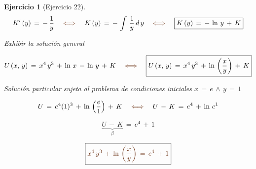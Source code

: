 \documentclass[a4paper,11pt]{book}
\newtheorem{ejer}{Ejercicio}[section]
\begin{document}
\begin{ejer}[Ejercicio 22]
  

$$K'\,(y)\,=\,-\,\dfrac{1}{y} \quad \textcolor{auburn}{\iff} \quad K\,(y)\,=\,-\,\int\,\dfrac{1}{y}\,d\,y \quad \textcolor{auburn}{\iff} \quad \boxed{K\,(y)\,=\,-\,\ln\,y\,+\,K}$$ 

  

 Exhibir la solución general  

  

$$U\,(x,\,y)\,=\,x^{4}\,y^{3}\,+\,\ln\,x\,-\,\ln\,y\,+\,K \quad \textcolor{auburn}{\iff} \quad \boxed{U\,(x,\,y)\,=\,x^{4}\,y^{3}\,+\,\ln\,\left(\dfrac{x}{y} \right)\,+\,K }$$ 

  

 Solución particular sujeta al problema de condiciones iniciales $\boxed{x\,=\,e \, \wedge \, y\,=\,1}$ 

  

$$U\,=\,e^{4}(1)^{3}\,+\,\ln\,\left(\dfrac{e}{1} \right)\,+\,K \quad \textcolor{auburn}{\iff} \quad U\,-\,K\,=\,e^{4}\,+\,\ln\,e^{1}$$ 

  

$$\underbrace{U\,-\,K}_{\beta}\,=\,e^{4}\,+\,1$$ 

  

$$\boxed{\textcolor{auburn}{x^{4}\,y^{3}\,+\,\ln\,\left(\dfrac{x}{y} \right)\,=\,e^{4}\,+\,1}} $$ 


\end{ejer} 

  
\end{document}
